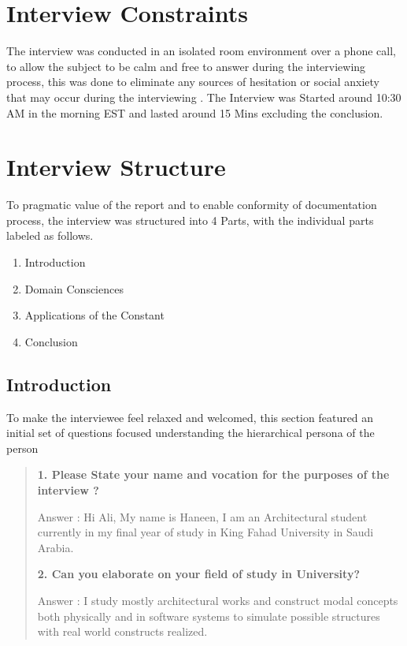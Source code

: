 \documentclass[12pt]{report}
\begin{document}
\begin{flushleft}
\section{Interview Constraints}

The interview was conducted in an isolated room environment over a phone call, to allow the subject to be calm and free to answer during the interviewing process, this was done to eliminate any sources of hesitation or social anxiety that may occur during the interviewing . The Interview was Started around 10:30 AM in the morning EST and lasted around 15 Mins excluding the conclusion.
\section{Interview Structure}
To pragmatic value of the report and to enable conformity of documentation process, the interview was structured into 4 Parts, with the individual parts labeled as follows.
\begin{enumerate}

\item{Introduction}
\item{Domain Consciences}
\item{Applications of the Constant}
\item{Conclusion}
\end{enumerate}

\subsection{Introduction}

To make the interviewee feel relaxed and welcomed, this section featured an initial set of questions focused understanding the hierarchical persona of the person  \hfill \break

   \begin{quote}
       
   
    \textbf{1. Please State your name and vocation for the purposes of the  interview ?}
    
    Answer : Hi Ali, My name is Haneen, I am an Architectural student currently in my final year of study in King Fahad University in Saudi Arabia.  
    \hfill \break
   
    \textbf{2. Can you elaborate on your field of study in University?}
    
    Answer : I study mostly architectural works and construct modal concepts both physically and in software systems to simulate possible structures with real world constructs realized.
    \hfill \break 
    

\end{quote}
\end{flushleft}
\end{document}
